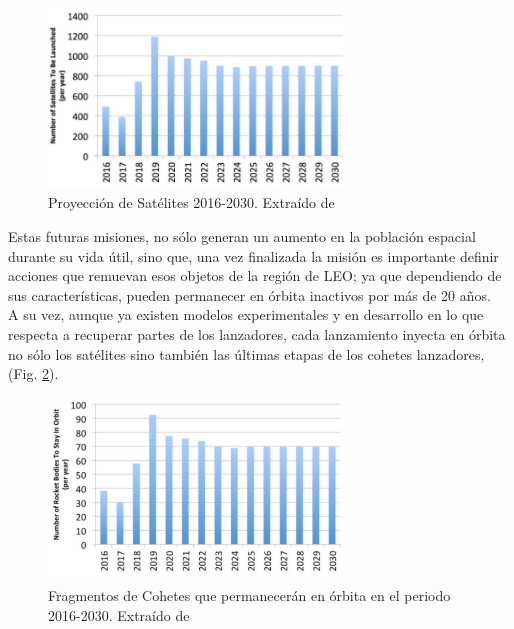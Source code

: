 \begin{figure}[!h]
  \centering
  \includegraphics[width=0.7\textwidth]{imagenes/satelxlanz}
  \caption[Proyecci\'on de Sat\'elites 2016-2030]{Proyecci\'on de Sat\'elites 2016-2030. Extra\'ido de \citep{karacalioglu2016impact}}
  \label{fig:satxlanz}
\end{figure}

Estas futuras misiones, no s\'olo generan un aumento en la poblaci\'on espacial durante su vida \'util, sino que, una vez finalizada la misi\'on es importante definir acciones que remuevan esos objetos de la regi\'on de LEO; ya que dependiendo de sus caracter\'isticas, pueden permanecer en \'orbita inactivos por m\'as de 20 a\~nos.\\

A su vez, aunque ya existen modelos experimentales y en desarrollo en lo que respecta a recuperar partes de los lanzadores, cada lanzamiento inyecta en \'orbita no s\'olo los sat\'elites sino tambi\'en las \'ultimas etapas de los cohetes lanzadores, (Fig. \ref{fig:rocketbodies}).\\

\begin{figure}[!h]
  \centering
  \includegraphics[width=0.7\textwidth]{imagenes/rocketbodies}
  \caption[Fragmentos de Cohetes 2016-2030]{Fragmentos de Cohetes que permanecer\'an en \'orbita en el periodo 2016-2030. Extra\'ido de \cite{karacalioglu2016impact}}
  \label{fig:rocketbodies}
\end{figure}

